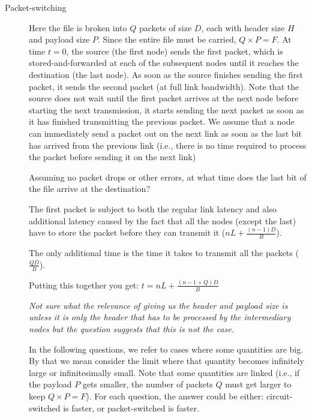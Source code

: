\documentclass{supervision}
\begin{document}
\begin{questions}
\begin{parts}
\begin{description}
\begin{subparts}
        
        
      \end{subparts}
      
      \item[Packet-switching]
      Here the file is broken into $Q$ packets of size $D$, each with header size $H$ and payload size $P$. Since the entire file must be carried, $Q \times P = F$. At time $t = 0$, the source (the first node) sends the first packet, which is stored-and-forwarded at each of the subsequent nodes until it reaches the destination (the last node). As soon as the source finishes sending the first packet, it sends the second packet (at full link bandwidth). Note that the source does not wait until the first packet arrives at the next node before starting the next transmission, it starts sending the next packet as soon as it has finished transmitting the previous packet. We assume that a node can immediately send a packet out on the next link as soon as the last bit has arrived from the previous link (i.e., there is no time required to process the packet before sending it on the next link)
      \begin{subparts}
        \subpart
        Assuming no packet drops or other errors, at what time does
the last bit of the file arrive at the destination?
        
        \begin{solution}
        The first packet is subject to both the regular link latency and also additional latency caused by the fact that all the nodes (except the last) have to store the packet before they can transmit it ($nL + \frac{(n-1)D}{B}$).
        
        The only additional time is the time it takes to transmit all the packets ($\frac{QD}{B}$).
        
        Putting this together you get: $t = nL + \frac{(n-1 + Q)D}{B}$
        
        \textit{Not sure what the relevance of giving us the header and payload size is unless it is only the header that has to be processed by the intermediary nodes but the question suggests that this is not the case.}
        \end{solution}

      \end{subparts}
      In the following questions, we refer to cases where some quantities are big. By that we mean consider the limit where that quantity becomes infinitely large or infinitesimally small. Note that some quantities are linked (i.e., if the payload $P$ gets smaller, the number of packets $Q$ must get larger to keep $Q \times P = F$). For each question, the answer could be either: circuit-switched is faster, or packet-switched is faster.
      

\end{description}
\end{parts}
\end{questions}
\end{document}
